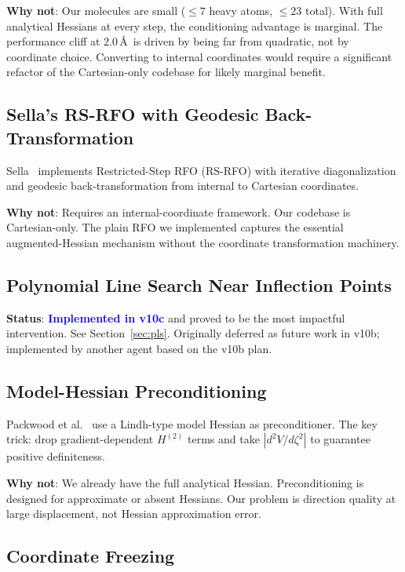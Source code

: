 \documentclass[11pt,a4paper]{article}
\theoremstyle{definition}
\begin{document}
\textbf{Why not}: Our molecules are small ($\leq 7$ heavy atoms, $\leq 23$
total).  With full analytical Hessians at every step, the conditioning
advantage is marginal.  The performance cliff at 2.0\,\AA\ is driven by
being far from quadratic, not by coordinate choice.  Converting to internal
coordinates would require a significant refactor of the Cartesian-only
codebase for likely marginal benefit.

\subsection{Sella's RS-RFO with Geodesic Back-Transformation}
\label{sec:sella}

Sella~\citep{sella} implements Restricted-Step RFO (RS-RFO) with iterative
diagonalization and geodesic back-transformation from internal to Cartesian
coordinates.

\textbf{Why not}: Requires an internal-coordinate framework.  Our codebase is
Cartesian-only.  The plain RFO we implemented captures the essential
augmented-Hessian mechanism without the coordinate transformation machinery.

\subsection{Polynomial Line Search Near Inflection Points}

\textbf{Status}: \textcolor{blue}{\textbf{Implemented in v10c}} and
proved to be the most impactful intervention.  See
Section~\ref{sec:pls}.  Originally deferred as future work in v10b;
implemented by another agent based on the v10b plan.

\subsection{Model-Hessian Preconditioning}

Packwood et al.~\citep{packwood2018} use a Lindh-type model Hessian as
preconditioner.  The key trick: drop gradient-dependent $H^{(2)}$ terms and
take $|d^2V/d\zeta^2|$ to guarantee positive definiteness.

\textbf{Why not}: We already have the full analytical Hessian.
Preconditioning is designed for approximate or absent Hessians.  Our problem
is direction quality at large displacement, not Hessian approximation error.

\subsection{Coordinate Freezing}
\end{document}
